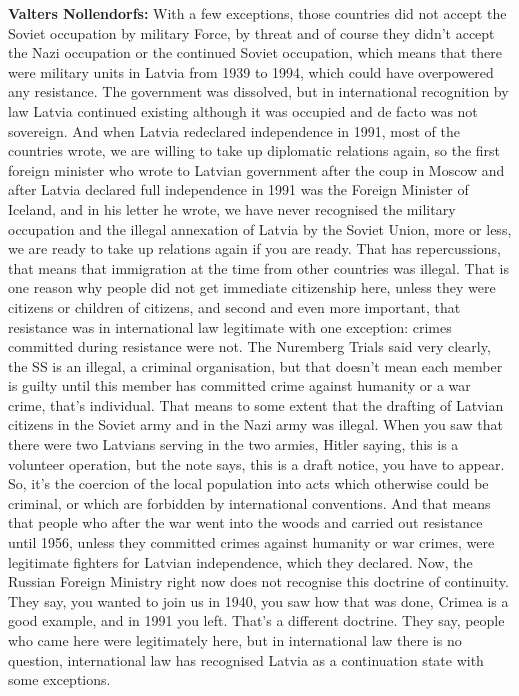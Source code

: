 \textbf{Valters Nollendorfs:} With a few exceptions, those countries did not accept the Soviet occupation by military Force, by threat and of course they didn't accept the Nazi occupation or the continued Soviet occupation, which means that there were military units in Latvia from 1939 to 1994, which could have overpowered any resistance. The government was dissolved, but in international recognition by law Latvia continued existing although it was occupied and de facto was not sovereign. And when Latvia redeclared independence in 1991, most of the countries wrote, we are willing to take up diplomatic relations again, so the first foreign minister who wrote to Latvian government after the coup in Moscow and after Latvia declared full independence in 1991 was the Foreign Minister of Iceland, and in his letter he wrote, we have never recognised the military occupation and the illegal annexation of Latvia by the Soviet Union, more or less, we are ready to take up relations again if you are ready. That has repercussions, that means that immigration at the time from other countries was illegal. That is one reason why people did not get immediate citizenship here, unless they were citizens or children of citizens, and second and even more important, that resistance was in international law legitimate with one exception: crimes committed during resistance were not. The Nuremberg Trials said very clearly, the SS is an illegal, a criminal organisation, but that doesn't mean each member is guilty until this member has committed crime against humanity or a war crime, that's individual. That means to some extent that the drafting of Latvian citizens in the Soviet army and in the Nazi army was illegal. When you saw that there were two Latvians serving in the two armies, Hitler saying, this is a volunteer operation, but the note says, this is a draft notice, you have to appear. So, it's the coercion of the local population into acts which otherwise could be criminal, or which are forbidden by international conventions. And that means that people who after the war went into the woods and carried out resistance until 1956, unless they committed crimes against humanity or war crimes, were legitimate fighters for Latvian independence, which they declared. Now, the Russian Foreign Ministry right now does not recognise this doctrine of continuity. They say, you wanted to join us in 1940, you saw how that was done, Crimea is a good example, and in 1991 you left. That's a different doctrine. They say, people who came here were legitimately here, but in international law there is no question, international law has recognised Latvia as a continuation state with some exceptions. 


